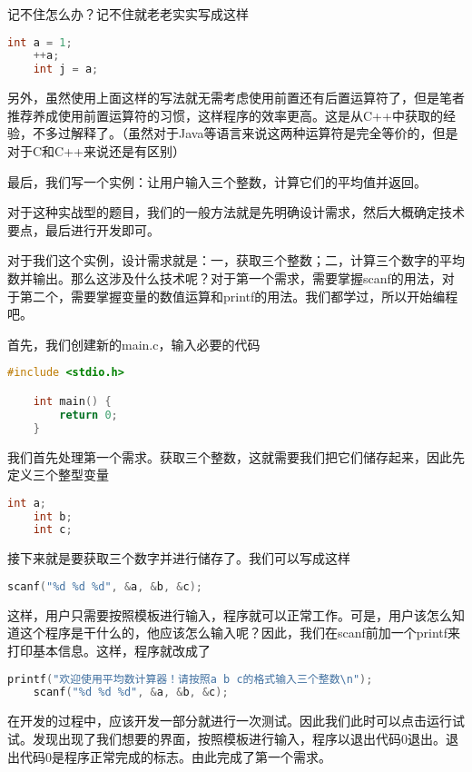 记不住怎么办？记不住就老老实实写成这样

\begin{lstlisting}[language=C]
    int a = 1;
    ++a;
    int j = a;
\end{lstlisting}

另外，虽然使用上面这样的写法就无需考虑使用前置还有后置运算符了，但是笔者推荐养成使用前置运算符的习惯，这样程序的效率更高。这是从C++中获取的经验，不多过解释了。（虽然对于Java等语言来说这两种运算符是完全等价的，但是对于C和C++来说还是有区别）

最后，我们写一个实例：让用户输入三个整数，计算它们的平均值并返回。

对于这种实战型的题目，我们的一般方法就是先明确设计需求，然后大概确定技术要点，最后进行开发即可。

对于我们这个实例，设计需求就是：一，获取三个整数；二，计算三个数字的平均数并输出。那么这涉及什么技术呢？对于第一个需求，需要掌握scanf的用法，对于第二个，需要掌握变量的数值运算和printf的用法。我们都学过，所以开始编程吧。

首先，我们创建新的main.c，输入必要的代码

\begin{lstlisting}[language=C]
    #include <stdio.h>

    int main() {
        return 0;
    }
\end{lstlisting}

我们首先处理第一个需求。获取三个整数，这就需要我们把它们储存起来，因此先定义三个整型变量

\begin{lstlisting}[language=C]
    int a;
    int b;
    int c;
\end{lstlisting}

接下来就是要获取三个数字并进行储存了。我们可以写成这样

\begin{lstlisting}[language=C]
    scanf("%d %d %d", &a, &b, &c);
\end{lstlisting}

这样，用户只需要按照模板进行输入，程序就可以正常工作。可是，用户该怎么知道这个程序是干什么的，他应该怎么输入呢？因此，我们在scanf前加一个printf来打印基本信息。这样，程序就改成了

\begin{lstlisting}[language=C]
    printf("欢迎使用平均数计算器！请按照a b c的格式输入三个整数\n");
    scanf("%d %d %d", &a, &b, &c);
\end{lstlisting}

在开发的过程中，应该开发一部分就进行一次测试。因此我们此时可以点击运行试试。发现出现了我们想要的界面，按照模板进行输入，程序以退出代码0退出。退出代码0是程序正常完成的标志。由此完成了第一个需求。

